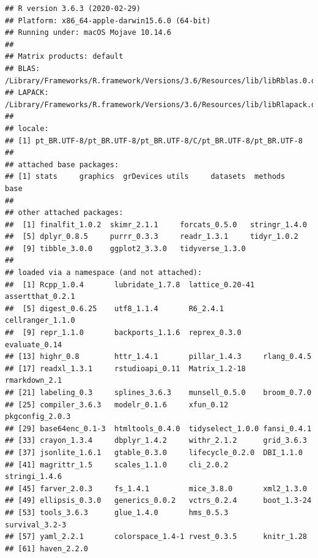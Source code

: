 \documentclass[]{article}
\begin{document}
\begin{verbatim}
## R version 3.6.3 (2020-02-29)
## Platform: x86_64-apple-darwin15.6.0 (64-bit)
## Running under: macOS Mojave 10.14.6
## 
## Matrix products: default
## BLAS:   /Library/Frameworks/R.framework/Versions/3.6/Resources/lib/libRblas.0.dylib
## LAPACK: /Library/Frameworks/R.framework/Versions/3.6/Resources/lib/libRlapack.dylib
## 
## locale:
## [1] pt_BR.UTF-8/pt_BR.UTF-8/pt_BR.UTF-8/C/pt_BR.UTF-8/pt_BR.UTF-8
## 
## attached base packages:
## [1] stats     graphics  grDevices utils     datasets  methods   base     
## 
## other attached packages:
##  [1] finalfit_1.0.2  skimr_2.1.1     forcats_0.5.0   stringr_1.4.0  
##  [5] dplyr_0.8.5     purrr_0.3.3     readr_1.3.1     tidyr_1.0.2    
##  [9] tibble_3.0.0    ggplot2_3.3.0   tidyverse_1.3.0
## 
## loaded via a namespace (and not attached):
##  [1] Rcpp_1.0.4       lubridate_1.7.8  lattice_0.20-41  assertthat_0.2.1
##  [5] digest_0.6.25    utf8_1.1.4       R6_2.4.1         cellranger_1.1.0
##  [9] repr_1.1.0       backports_1.1.6  reprex_0.3.0     evaluate_0.14   
## [13] highr_0.8        httr_1.4.1       pillar_1.4.3     rlang_0.4.5     
## [17] readxl_1.3.1     rstudioapi_0.11  Matrix_1.2-18    rmarkdown_2.1   
## [21] labeling_0.3     splines_3.6.3    munsell_0.5.0    broom_0.7.0     
## [25] compiler_3.6.3   modelr_0.1.6     xfun_0.12        pkgconfig_2.0.3 
## [29] base64enc_0.1-3  htmltools_0.4.0  tidyselect_1.0.0 fansi_0.4.1     
## [33] crayon_1.3.4     dbplyr_1.4.2     withr_2.1.2      grid_3.6.3      
## [37] jsonlite_1.6.1   gtable_0.3.0     lifecycle_0.2.0  DBI_1.1.0       
## [41] magrittr_1.5     scales_1.1.0     cli_2.0.2        stringi_1.4.6   
## [45] farver_2.0.3     fs_1.4.1         mice_3.8.0       xml2_1.3.0      
## [49] ellipsis_0.3.0   generics_0.0.2   vctrs_0.2.4      boot_1.3-24     
## [53] tools_3.6.3      glue_1.4.0       hms_0.5.3        survival_3.2-3  
## [57] yaml_2.2.1       colorspace_1.4-1 rvest_0.3.5      knitr_1.28      
## [61] haven_2.2.0
\end{verbatim}
\end{document}
